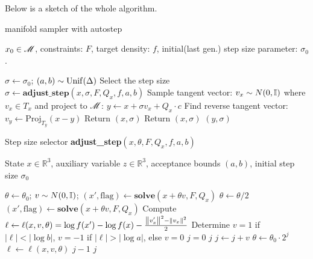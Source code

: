\documentclass{article}
\begin{document}
Below is a sketch of the whole algorithm.
\begin{algorithm}[H]
\caption{manifold sampler with autostep}
\label{algo:manifold_autostep}
\begin{algorithmic}[1]
    \Require $x_0 \in \mathscr{M}$, constraints: $F$, target density: $f$, initial(last gen.) step size parameter: $\sigma_0$. 

    \State $\sigma \gets \sigma_0$; $(a, b) \sim \operatorname{Unif}(\Delta)$
    \State Select the step size $\sigma \gets \textbf{adjust\_step}(x, \sigma, F, Q_x, f, a, b)$
    \State Sample tangent vector: $v_x \sim N(0, \mathbb I)$ where $v_x \in T_x$ and project to $\mathscr{M}$: $y \gets x + \sigma v_x + Q_x\cdot c$
    \State Find reverse tangent vector: $v_y \gets \text{Proj}_{T_y}(x-y)$
      
        \State Return $(x, \sigma)$
    \EndIf
     
        \State Return $(x, \sigma)$
    \EndIf
    \State \Return $(y, \sigma)$
    \end{algorithmic}
\end{algorithm}


\begin{algorithm}[H]
\caption{Step size selector \textbf{adjust\_step}$(x, \theta, F, Q_x, f, a, b)$}
\label{algo:stepsize_selector}
\begin{algorithmic}[1]
\Require State $x \in \mathbb{R}^3$, auxiliary variable $z \in \mathbb{R}^3$, acceptance bounds $(a, b)$, initial step size $\sigma_0$

\State $\theta \gets \theta_0$; $v \sim N(0, \mathbb I)$; $(x', \text{flag}) \gets \textbf{solve}(x+\theta v, F, Q_x)$
    \State $\theta \gets \theta / 2$ 
    \State $(x', \text{flag}) \gets \textbf{solve}(x+\theta v, F, Q_x)$
\EndWhile
\State Compute $\ell \gets \ell(x, v, \theta) = \log f(x') - \log f(x) - \frac{\left\lVert v_x'\right\rVert^2-\left\lVert v_x\right\rVert^2}{2}$
\State Determine $v = 1$ if $|\ell| < |\log b|$, $v = -1$ if $|\ell| > |\log a|$, else $v = 0$
\State $j = 0$
    \State \Return $j$
\EndIf
{}
    \State $j \gets j + v$
    \State $\theta \gets \theta_0 \cdot 2^j$
    \State $\ell \gets \ell(x, v, \theta)$
        \State \Return $j - 1$
        \State \Return $j$
    \EndIf
\EndWhile
\end{algorithmic}
\end{algorithm}
\end{document}
